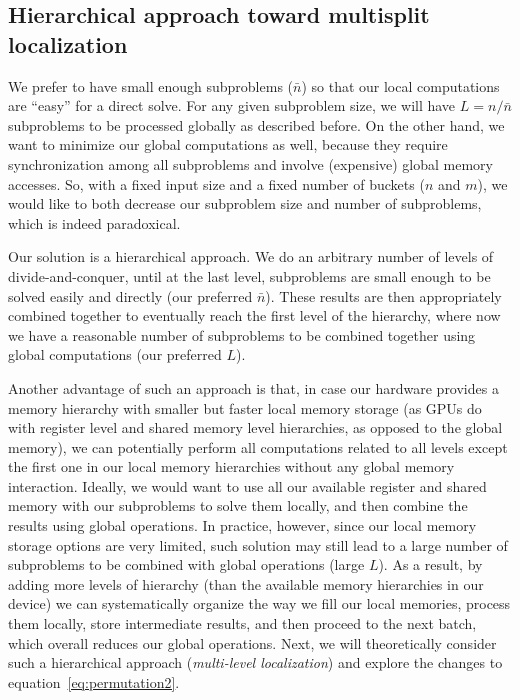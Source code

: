 \subsection{Hierarchical approach toward multisplit localization}\label{subsec:localization}
We prefer to have small enough subproblems ($\bar{n}$) so that our local computations are ``easy'' for a direct solve. For any given subproblem size, we will have $L = n/\bar{n}$ subproblems to be processed globally as described before.
On the other hand, we want to minimize our global computations as well, because they require synchronization among all subproblems and involve (expensive) global memory accesses.
So, with a fixed input size and a fixed number of buckets ($n$ and $m$), we would like to both decrease our subproblem size and number of subproblems, which is indeed paradoxical.

Our solution is a hierarchical approach. We do an arbitrary number of levels of divide-and-conquer, until at the last level, subproblems are small enough to be solved easily and directly (our preferred $\bar{n}$).
These results are then appropriately combined together to eventually reach the first level of the hierarchy, where now we have a reasonable number of subproblems to be combined together using global computations (our preferred $L$).

Another advantage of such an approach is that, in case our hardware provides a memory hierarchy with smaller but faster local memory storage (as GPUs do with register level and shared memory level hierarchies, as opposed to the global memory), we can potentially perform all computations related to all levels except the first one in our local memory hierarchies without any global memory interaction.
Ideally, we would want to use all our available register and shared memory with our subproblems to solve them locally, and then combine the results using global operations.
In practice, however, since our local memory storage options are very limited, such solution may still lead to a large number of subproblems to be combined with global operations (large $L$).
As a result, by adding more levels of hierarchy (than the available memory hierarchies in our device) we can systematically organize the way we fill our local memories, process them locally, store intermediate results, and then proceed to the next batch, which overall reduces our global operations.
 Next, we will theoretically consider such a hierarchical approach (\emph{multi-level localization}) and explore the changes to equation~\eqref{eq:permutation2}.

